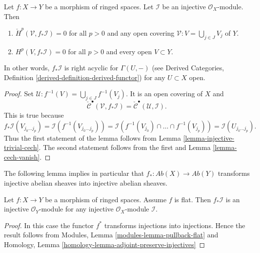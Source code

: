 \begin{lemma}
\label{lemma-pushforward-injective}
Let $f : X \to Y$ be a morphism of ringed spaces.
Let $\mathcal{I}$ be an injective $\mathcal{O}_X$-module.
Then
\begin{enumerate}
\item $\check{H}^p(\mathcal{V}, f_*\mathcal{I}) = 0$
for all $p > 0$ and any open covering
$\mathcal{V} : V = \bigcup_{j \in J} V_j$ of $Y$.
\item $H^p(V, f_*\mathcal{I}) = 0$ for all $p > 0$ and
every open $V \subset Y$.
\end{enumerate}
In other words, $f_*\mathcal{I}$ is right acyclic for $\Gamma(U, -)$
(see
Derived Categories, Definition \ref{derived-definition-derived-functor})
for any $U \subset X$ open.
\end{lemma}

\begin{proof}
Set $\mathcal{U} : f^{-1}(V) = \bigcup_{j \in J} f^{-1}(V_j)$.
It is an open covering of $X$ and
$$
\check{\mathcal{C}}^\bullet(\mathcal{V}, f_*\mathcal{I}) =
\check{\mathcal{C}}^\bullet(\mathcal{U}, \mathcal{I}).
$$
This is true because
$$
f_*\mathcal{I}(V_{j_0 \ldots j_p})
= \mathcal{I}(f^{-1}(V_{j_0 \ldots j_p})) =
\mathcal{I}(f^{-1}(V_{j_0}) \cap \ldots \cap f^{-1}(V_{j_p}))
= \mathcal{I}(U_{j_0 \ldots j_p}).
$$
Thus the first statement of the lemma follows from
Lemma \ref{lemma-injective-trivial-cech}. The second statement
follows from the first and Lemma \ref{lemma-cech-vanish}.
\end{proof}

\noindent
The following lemma implies in particular that
$f_* : \textit{Ab}(X) \to \textit{Ab}(Y)$ transforms injective
abelian sheaves into injective abelian sheaves.

\begin{lemma}
\label{lemma-pushforward-injective-flat}
Let $f : X \to Y$ be a morphism of ringed spaces.
Assume $f$ is flat.
Then $f_*\mathcal{I}$ is an injective $\mathcal{O}_Y$-module
for any injective $\mathcal{O}_X$-module $\mathcal{I}$.
\end{lemma}

\begin{proof}
In this case the functor $f^*$ transforms injections into injections.
Hence the result follows from
Modules, Lemma \ref{modules-lemma-pullback-flat} and
Homology, Lemma \ref{homology-lemma-adjoint-preserve-injectives}
\end{proof}













